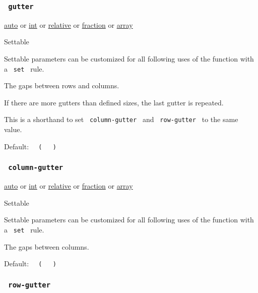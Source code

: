\subsubsection{\texorpdfstring{\texttt{\ gutter\ }}{ gutter }}\label{parameters-gutter}

\href{/docs/reference/foundations/auto/}{auto} {or}
\href{/docs/reference/foundations/int/}{int} {or}
\href{/docs/reference/layout/relative/}{relative} {or}
\href{/docs/reference/layout/fraction/}{fraction} {or}
\href{/docs/reference/foundations/array/}{array}

{{ Settable }}

\label{parameters-gutter-settable-tooltip}
Settable parameters can be customized for all following uses of the
function with a \texttt{\ set\ } rule.

The gaps between rows and columns.

If there are more gutters than defined sizes, the last gutter is
repeated.

This is a shorthand to set \texttt{\ column-gutter\ } and
\texttt{\ row-gutter\ } to the same value.

Default:
\texttt{\ }{\texttt{\ (\ }}\texttt{\ }{\texttt{\ )\ }}\texttt{\ }

\subsubsection{\texorpdfstring{\texttt{\ column-gutter\ }}{ column-gutter }}\label{parameters-column-gutter}

\href{/docs/reference/foundations/auto/}{auto} {or}
\href{/docs/reference/foundations/int/}{int} {or}
\href{/docs/reference/layout/relative/}{relative} {or}
\href{/docs/reference/layout/fraction/}{fraction} {or}
\href{/docs/reference/foundations/array/}{array}

{{ Settable }}

\label{parameters-column-gutter-settable-tooltip}
Settable parameters can be customized for all following uses of the
function with a \texttt{\ set\ } rule.

The gaps between columns.

Default:
\texttt{\ }{\texttt{\ (\ }}\texttt{\ }{\texttt{\ )\ }}\texttt{\ }

\subsubsection{\texorpdfstring{\texttt{\ row-gutter\ }}{ row-gutter }}\label{parameters-row-gutter}

